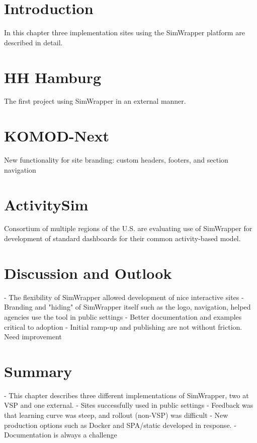\section{Introduction}
\label{07-simwrapper-sites-intro}

In this chapter three implementation sites using the SimWrapper platform are described in detail.

\section{HH Hamburg}
\label{07-simwrapper-sites-hamburg}

The first project using SimWrapper in an external manner.

\section{KOMOD-Next}
\label{07-simwrapper-sites-komodnext}

New functionality for site branding: custom headers, footers, and section navigation

\section{ActivitySim}
\label{07-simwrapper-sites-activitysim}

Consortium of multiple regions of the U.S. are evaluating use of SimWrapper for development of standard dashboards for their common activity-based model.

\section{Discussion and Outlook}
\label{07-simwrapper-sites-discussion}

- The flexibility of SimWrapper allowed development of nice interactive sites
- Branding and "hiding" of SimWrapper itself such as the logo, navigation, helped agencies use the tool in public settings
- Better documentation and examples critical to adoption
- Initial ramp-up and publishing are not without friction. Need improvement

\section{Summary}
\label{07-simwrapper-sites-summary}

- This chapter describes three different implementations of SimWrapper, two at VSP and one external.
- Sites successfully used in public settings
- Feedback was that learning curve was steep, and rollout (non-VSP) was difficult
- New production options such as Docker and SPA/static developed in response.
- Documentation is always a challenge
